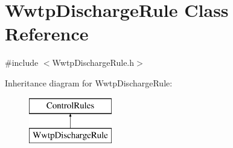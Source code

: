 \hypertarget{classWwtpDischargeRule}{}\section{Wwtp\+Discharge\+Rule Class Reference}
\label{classWwtpDischargeRule}


{\ttfamily \#include $<$Wwtp\+Discharge\+Rule.\+h$>$}

Inheritance diagram for Wwtp\+Discharge\+Rule\+:\begin{figure}[H]
\begin{center}
\leavevmode
\includegraphics[height=2.000000cm]{classWwtpDischargeRule}
\end{center}
\end{figure}
